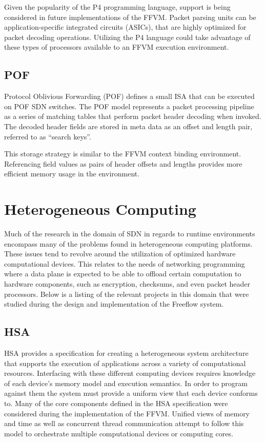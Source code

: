Given the popularity of the P4 programming language, support is being
considered in future implementations of the FFVM. Packet parsing units can be
application-specific integrated circuits (ASICs), that are highly optimized for
packet decoding operations. Utilizing the P4 language could take
advantage of these types of processors available to an FFVM execution environment.

\subsection{POF}
\label{related:pof}
Protocol Oblivious Forwarding (POF) \cite{pof} defines a small ISA that can
be executed on POF SDN switches. The POF model represents a packet processing
pipeline as a series of matching tables that perform packet header decoding
when invoked. The decoded header fields are stored in meta data as an offset
and length pair, referred to as ``search keys''.

This storage strategy is
similar to the FFVM context binding environment. Referencing field values as pairs of header offsets and lengths provides more efficient memory usage in the environment.

\section{Heterogeneous Computing}
\label{related:hcp}
Much of the research in the domain of SDN in regards to runtime environments
encompass many of the problems found in heterogeneous computing platforms.
These issues tend to revolve around the utilization of optimized hardware
computational devices. This relates to the needs of networking programming
where a data plane is expected to be able to offload certain computation to
hardware components, such as encryption, checksums, and even packet header
processors. Below is a listing of the relevant projects in this domain that
were studied during the design and implementation of the Freeflow system.

\subsection{HSA}
\label{related:hsa}
HSA \cite{hsa} provides a specification for creating a heterogeneous
system architecture that supports the execution of applications across a
variety of computational resources. Interfacing with these different computing
devices requires knowledge of each device's memory model and execution
semantics. In order to program against them the system must provide a
uniform view that each device conforms to. Many of the core components defined
in the HSA specification were considered during the implementation of the FFVM.
 Unified views of memory and time as well as concurrent thread communication
 attempt to follow this model to orchestrate multiple computational devices or
 computing cores.

